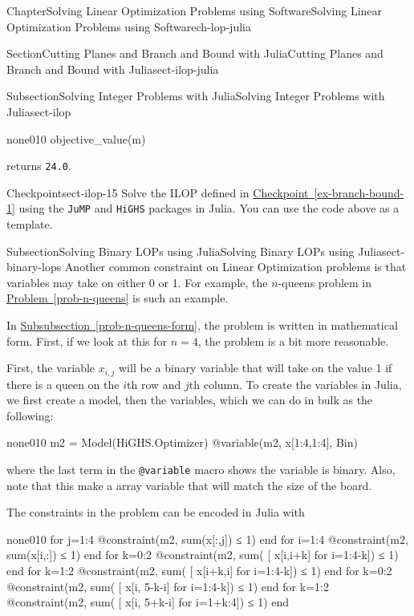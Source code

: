\documentclass[oneside,10pt,]{book}
\newcommand{\xreffont}{\relax}
\newcommand{\mono}[1]{\texttt{#1}}
\numberwithin{equation}{section}
\begin{document}
\begin{chapterptx}{Chapter}{Solving Linear Optimization Problems using Software}{}{Solving Linear Optimization Problems using Software}{}{}{ch-lop-julia}
\begin{sectionptx}{Section}{Cutting Planes and Branch and Bound with Julia}{}{Cutting Planes and Branch and Bound with Julia}{}{}{sect-ilop-julia}
\begin{subsectionptx}{Subsection}{Solving Integer Problems with Julia}{}{Solving Integer Problems with Julia}{}{}{sect-ilop}
\begin{program}{none}{0}{1}{0}
objective_value(m)
\end{program}
returns \mono{24.0}.%
\begin{inlineexercise}{Checkpoint}{}{sect-ilop-15}%
Solve the ILOP defined in \hyperref[ex-branch-bound-1]{Checkpoint~{\xreffont\ref{ex-branch-bound-1}}} using the \mono{JuMP} and \mono{HiGHS} packages in Julia.  You can use the code above as a template.%
\end{inlineexercise}%
\end{subsectionptx}
%
%
\typeout{************************************************}
\typeout{************************************************}
%
\begin{subsectionptx}{Subsection}{Solving Binary LOPs using Julia}{}{Solving Binary LOPs using Julia}{}{}{sect-binary-lops}
Another common constraint on Linear Optimization problems is that variables may take on either 0 or 1. For example, the \(n\)-queens problem in \hyperref[prob-n-queens]{Problem~{\xreffont\ref{prob-n-queens}}} is such an example.%
\par
In \hyperref[prob-n-queens-form]{Subsubsection~{\xreffont\ref{prob-n-queens-form}}}, the problem is written in mathematical form. First, if we look at this for \(n=4\), the problem is a bit more reasonable.%
\par
First, the variable \(x_{i,j}\) will be a binary variable that will take on the value 1 if there is a queen on the \(i\)th row and \(j\)th column.  To create the variables in Julia, we first create a model, then the variables, which we can do in bulk as the following:%
\begin{program}{none}{0}{1}{0}
m2 = Model(HiGHS.Optimizer)
@variable(m2, x[1:4,1:4], Bin)
\end{program}
where the last term in the \mono{@variable} macro shows the variable is binary. Also, note that this make a array variable that will match the size of the board.%
\par
The constraints in the problem can be encoded in Julia with%
\begin{programnumbered}{none}{0}{1}{0}
for j=1:4
  @constraint(m2, sum(x[:,j]) ≤  1)
end
for i=1:4
  @constraint(m2, sum(x[i,:]) ≤ 1)
end
for k=0:2
  @constraint(m2, sum( [ x[i,i+k] for i=1:4-k]) ≤ 1)
end
for k=1:2
  @constraint(m2, sum( [ x[i+k,i] for i=1:4-k]) ≤ 1)
end
for k=0:2
  @constraint(m2, sum( [ x[i, 5-k-i] for i=1:4-k]) ≤ 1)
end
for k=1:2
  @constraint(m2, sum( [ x[i, 5+k-i] for i=1+k:4]) ≤ 1)
end
\end{programnumbered}

\end{subsectionptx}
\end{sectionptx}
\end{chapterptx}
\end{document}
